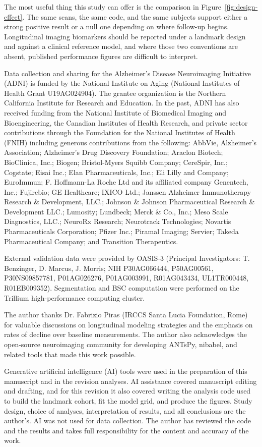 \documentclass[blue]{ludusofficial}  %
\begin{document}
The most useful thing this study can offer is the comparison in Figure~\ref{fig:design-effect}. The same scans, the same code, and the same subjects support either a strong positive result or a null one depending on where follow-up begins. Longitudinal imaging biomarkers should be reported under a landmark design and against a clinical reference model, and where those two conventions are absent, published performance figures are difficult to interpret.

\begin{acknowledgments}
Data collection and sharing for the Alzheimer's Disease Neuroimaging Initiative (ADNI) is funded by the National Institute on Aging (National Institutes of Health Grant U19AG024904). The grantee organization is the Northern California Institute for Research and Education. In the past, ADNI has also received funding from the National Institute of Biomedical Imaging and Bioengineering, the Canadian Institutes of Health Research, and private sector contributions through the Foundation for the National Institutes of Health (FNIH) including generous contributions from the following: AbbVie, Alzheimer's Association; Alzheimer's Drug Discovery Foundation; Araclon Biotech; BioClinica, Inc.; Biogen; Bristol-Myers Squibb Company; CereSpir, Inc.; Cogstate; Eisai Inc.; Elan Pharmaceuticals, Inc.; Eli Lilly and Company; EuroImmun; F. Hoffmann-La Roche Ltd and its affiliated company Genentech, Inc.; Fujirebio; GE Healthcare; IXICO Ltd.; Janssen Alzheimer Immunotherapy Research \& Development, LLC.; Johnson \& Johnson Pharmaceutical Research \& Development LLC.; Lumosity; Lundbeck; Merck \& Co., Inc.; Meso Scale Diagnostics, LLC.; NeuroRx Research; Neurotrack Technologies; Novartis Pharmaceuticals Corporation; Pfizer Inc.; Piramal Imaging; Servier; Takeda Pharmaceutical Company; and Transition Therapeutics.

External validation data were provided by OASIS-3 (Principal Investigators: T. Benzinger, D. Marcus, J. Morris; NIH P30AG066444, P50AG00561, P30NS09857781, P01AG026276, P01AG003991, R01AG043434, UL1TR000448, R01EB009352). Segmentation and BSC computation were performed on the Trillium high-performance computing cluster.

The author thanks Dr. Fabrizio Piras (IRCCS Santa Lucia Foundation, Rome) for valuable discussions on longitudinal modeling strategies and the emphasis on rates of decline over baseline measurements. The author also acknowledges the open-source neuroimaging community for developing ANTsPy, nibabel, and related tools that made this work possible.

Generative artificial intelligence (AI) tools were used in the preparation of this manuscript and in the revision analyses. AI assistance covered manuscript editing and drafting, and for this revision it also covered writing the analysis code used to build the landmark cohort, fit the model grid, and produce the figures. Study design, choice of analyses, interpretation of results, and all conclusions are the author's. AI was not used for data collection. The author has reviewed the code and the results and takes full responsibility for the content and accuracy of the work.
\end{acknowledgments}



\end{document}
